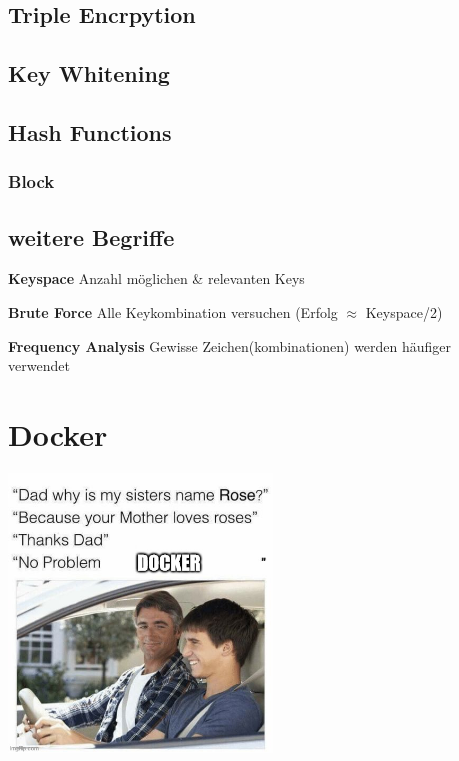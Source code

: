\documentclass[
  10pt,
  a4paper,
  twocolumn]{article}
\begin{document}
\subsection{Triple Encrpytion}\label{triple-encrpytion}

\subsection{Key Whitening}\label{key-whitening}

\subsection{Hash Functions}\label{hash-functions}

\subsubsection{Block}\label{block}

\subsection{weitere Begriffe}\label{weitere-begriffe}

{\small
\textbf{Keyspace} Anzahl möglichen \& relevanten Keys

\textbf{Brute Force} Alle Keykombination versuchen (Erfolg $\approx$ Keyspace/2)

\textbf{Frequency Analysis} Gewisse Zeichen(kombinationen) werden häufiger verwendet 

}

\newpage

\section{\texorpdfstring{Docker }{Docker }}\label{docker}

\begin{center}
\includegraphics[width=7cm,height=\textheight]{images/meme_docker.jpg}
\end{center}
\end{document}

